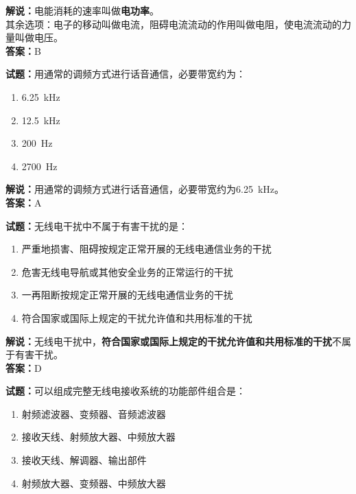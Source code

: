 \documentclass{ctexbook}
\begin{document}
\noindent\textbf{解说：}电能消耗的速率叫做\textbf{电功率}。\\
其余选项：电子的移动叫做电流，阻碍电流流动的作用叫做电阻，使电流流动的力量叫做电压。\\
\noindent\textbf{答案：}B


\bigskip


\noindent\textbf{试题：}用通常的调频方式进行话音通信，必要带宽约为：

\begin{enumerate}[leftmargin=3em]
	\item \SI{6.25}{\kHz}
	\item \SI{12.5}{\kHz}
	\item \SI{200}{\Hz}
	\item \SI{2700}{\Hz}
\end{enumerate}

\noindent\textbf{解说：}用通常的调频方式进行话音通信，必要带宽约为\SI{6.25}{\kHz}。\\
\noindent\textbf{答案：}A


\bigskip


\noindent\textbf{试题：}无线电干扰中不属于有害干扰的是：

\begin{enumerate}[leftmargin=3em]
	\item 严重地损害、阻碍按规定正常开展的无线电通信业务的干扰
	\item 危害无线电导航或其他安全业务的正常运行的干扰
	\item 一再阻断按规定正常开展的无线电通信业务的干扰
	\item 符合国家或国际上规定的干扰允许值和共用标准的干扰
\end{enumerate}

\noindent\textbf{解说：}无线电干扰中，\textbf{符合国家或国际上规定的干扰允许值和共用标准的干扰}不属于有害干扰。\\\noindent\textbf{答案：}D


\bigskip


\noindent\textbf{试题：}可以组成完整无线电接收系统的功能部件组合是：

\begin{enumerate}[leftmargin=3em]
	\item 射频滤波器、变频器、音频滤波器
	\item 接收天线、射频放大器、中频放大器
	\item 接收天线、解调器、输出部件
	\item 射频放大器、变频器、中频放大器
\end{enumerate}
\end{document}
